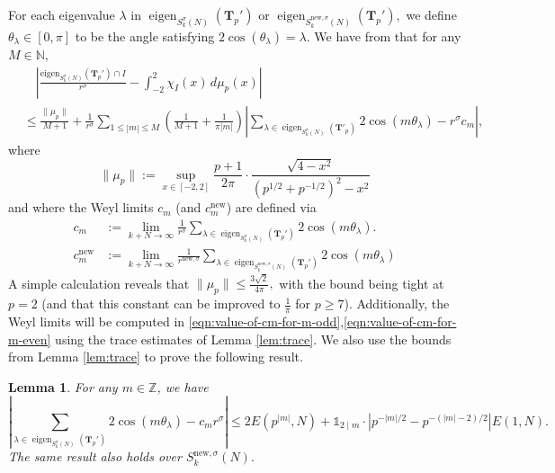 \documentclass[11pt,letterpaper,reqno]{amsart}
\newtheorem{lemma}[theorem]{Lemma}
\theoremstyle{definition}
\numberwithin{equation}{section}
\numberwithin{figure}{section}
\numberwithin{table}{section}
\newcommand{\nw}{\mathrm{new}}
\newcommand{\eigen}{\operatorname{eigen}}
\begin{document}
For each eigenvalue $\lambda$ in $\eigen_{S_k^\sigma(N)}( \mathbf{T}_p')$ or $\eigen_{S_k^{\nw, \sigma}(N)}(\mathbf{T}_p'),$ we define $\theta_\lambda \in [0, \pi]$ to be the angle satisfying $2 \cos (\theta_\lambda) = \lambda.$ We have from \cite[\S10]{MS07} that for any $M \in \mathbb{N},$
\begin{align}
    & \quad \left| \frac{\text{eigen}_{S_k^\sigma(N)}(\mathbf{T}_p') \cap I}{r^\sigma} - \int_{-2}^2 \chi_I(x) \, d \mu_p(x)  \right|\\
    &\leq \frac{\| \mu_p \|}{M + 1} + \frac{1}{r^\sigma}\sum_{1 \leq |m| \leq M} \left( \frac{1}{M + 1} + \frac{1}{\pi|m|} \right) \left| \sum_{\lambda \in \eigen_{S_k^\sigma(N)}(\mathbf{T}'_p)}  2\cos\left(m \theta_\lambda \right) - r^\sigma c_m \right|, \label{eqn:ms-section-theorem-8-variant}
\end{align}
where
$$\| \mu_p\| := \sup_{x \in [-2, 2]} \frac{p + 1}{2\pi} \cdot \frac{\sqrt{4 - x^2}}{\left( p^{1/2} + p^{-1/2}  \right)^2 -  x^2}$$
and where the Weyl limits $c_m$ (and $c_m^\nw$) are defined via
\begin{align*}
    c_m &:=
\lim_{k+N\to\infty}
\frac{1}{r^\sigma}
\sum_{\lambda \in \operatorname{eigen}_{S_k^{\sigma}(N)}(\mathbf{T}_p')}
2\cos(m\theta_\lambda).\\
c_m^{\nw} &:= \lim_{k + N\to\infty}
\frac{1}{r^{\nw, \sigma}}
\sum_{\lambda \in \operatorname{eigen}_{S_k^{\nw,\sigma}(N)}(\mathbf{T}_p')}
2\cos(m\theta_\lambda)
\end{align*}
A simple calculation reveals that $\| \mu_p \| \leq \frac{3\sqrt{2}}{4\pi},$ with the bound being tight at $p = 2$ (and that this constant can be improved to $\frac{1}{\pi}$ for $p \geq 7$). Additionally, the Weyl limits will be computed in \eqref{eqn:value-of-cm-for-m-odd},\eqref{eqn:value-of-cm-for-m-even} using the trace estimates of Lemma \ref{lem:trace}. 
We also use the bounds from Lemma \ref{lem:trace} to prove the following result. 

\begin{lemma} \label{lem:weyl-limits}
    For any $m \in \mathbb{Z}$, we have
    $$ \left| \sum_{\lambda \in \eigen_{S_k^\sigma(N)}(\mathbf{T}_p')} 2\cos(m\theta_\lambda) -c_m r^\sigma \right| \leq  2E(p^{|m|},N) + 
    \mathds{1}_{2 \mid m} \cdot \left| p^{-|m|/2} - p^{-(|m| - 2)/2} \right| E(1, N).
    $$
    The same result also holds over $S_k^{\nw, \sigma}(N).$
\end{lemma}
\end{document}
